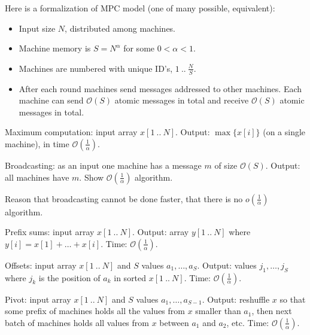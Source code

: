 \documentclass[12pt]{uebung}
\begin{document}
 
\newcommand{\bigo}{\mathcal{O}}
\renewcommand{\aufgname}{Exercise}


Here is a formalization of MPC model (one of many possible, equivalent):

\begin{itemize}
\item Input size $N$, distributed among machines.
\item Machine memory is $S = N^{\alpha}$ for some $0 < \alpha < 1$.
\item Machines are numbered with unique ID's, $1\ ..\ \frac{N}{S}$.
\item After each round machines send messages addressed to other machines. Each machine can send $\bigo(S)$ atomic messages  in total and receive $\bigo(S)$ atomic messages in total.
\end{itemize}

\begin{aufg}
Maximum computation: input array $x[1\ ..\ N]$. Output: $\max\{x[i]\}$ (on a single machine), in time $\bigo(\frac{1}{\alpha})$.
\end{aufg}

\begin{aufg}
Broadcasting: as an input one machine has a message $m$ of size $\bigo(S)$. Output: all machines have $m$. Show $\bigo(\frac{1}{\alpha})$ algorithm.
\end{aufg}

\begin{aufg}
Reason that broadcasting cannot be done faster, that there is no $o(\frac{1}{\alpha})$ algorithm.
\end{aufg}

\begin{aufg}
Prefix sums:  input array $x[1\ ..\ N]$. Output: array $y[1\ ..\ N]$ where $y[i] = x[1]+\ldots+x[i]$. Time: $\bigo(\frac{1}{\alpha})$.
\end{aufg}

\begin{aufg}
Offsets: input array $x[1\ ..\ N]$ and $S$ values $a_1,\ldots,a_S$. Output: values $j_1,\ldots,j_S$ where $j_k$ is the position of $a_k$ in sorted $x[1\ ..\ N]$. Time: $\bigo(\frac{1}{\alpha})$.
\end{aufg}

\begin{aufg}
Pivot: input array $x[1\ ..\ N]$ and $S$ values $a_1,\ldots,a_{S-1}$. Output: reshuffle $x$ so that some prefix of machines holds all the values from $x$ smaller than $a_1$, then next batch of machines holds all values from $x$ between $a_1$ and $a_2$, etc. Time: $\bigo(\frac{1}{\alpha})$.
\end{aufg}
\end{document}
